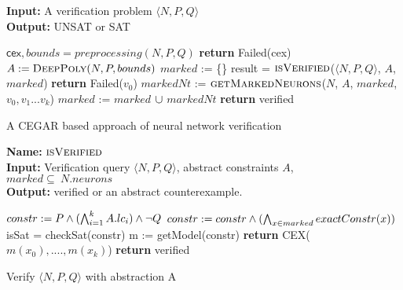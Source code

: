 



\begin{algorithm}[t]
  \textbf{Input: } A verification problem $\langle N,P,Q \rangle$ \\
  \textbf{Output: } UNSAT or SAT
  \begin{algorithmic}[1]
    \State $\mathsf{cex}, bounds = preprocessing(N,P,Q)$
      \State \textbf{return} Failed(cex)
    \EndIf
    \State $A := \textsc{DeepPoly}{(N,P, bounds)}$
    \State $marked$ := \{\}
      \State result = $\textsc{isVerified}$($\langle N,P,Q \rangle$, $A$, $marked$)
          \State \textbf{return} Failed(${v_0}$)
        \Else
        \State $markedNt$ := $\textsc{getMarkedNeurons}$($N$, $A$, $marked$, ${v_0}, {v_1} ... {v_k}$)
          \State $marked$ := $marked$ ${\cup}$ $markedNt$
        \EndIf
      \Else
        \State \textbf{return} verified
      \EndIf
    \EndWhile
  \end{algorithmic}
  \caption{A CEGAR based approach of neural network verification}
  \label{algo:main}
\end{algorithm}
\begin{algorithm}[t]
  \textbf{Name: } $\textsc{isVerified}$ \\
  \textbf{Input: } Verification query $\langle N,P,Q \rangle$, abstract constraints $A$, $marked \subseteq ~ N.neurons$ \\
  \textbf{Output: } verified or an abstract counterexample. 
  \begin{algorithmic}[1]
    \State $constr := P \land (\bigwedge_{i=1}^k A.lc_i)\land \neg Q$
    \State $constr := constr \land (\bigwedge_{x \in marked} exactConstr(x))$ 
    \State isSat = checkSat(constr)
      \State m := getModel(constr)
      \State \textbf{return} CEX($m(x_0),....,m(x_k)$)
    \Else
      \State \textbf{return} verified
    \EndIf
  \end{algorithmic}
  \caption{Verify $\langle N,P,Q \rangle$ with abstraction A}
  \label{algo:verif1}
\end{algorithm}

